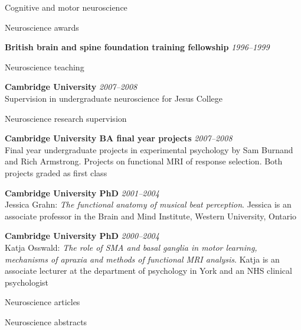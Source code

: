 \documentclass{cv}
\newcommand{\PlaceDateNote}[3]{{\bf #1} \hfill {\em #2} \\#3}
\begin{document}
\begin{cvSection}{Cognitive and motor neuroscience}

\begin{cvSubSection}{Neuroscience awards}

{\bf British brain and spine foundation training fellowship} \hfill {\em
1996--1999}

\end{cvSubSection}

\begin{cvSubSection}{Neuroscience teaching}

\PlaceDateNote{Cambridge University}{2007--2008}{
Supervision in undergraduate neuroscience for Jesus College}

\end{cvSubSection}

\begin{cvSubSection}{Neuroscience research supervision}

\PlaceDateNote{Cambridge University BA final year projects}{2007--2008}
{Final year undergraduate projects in experimental psychology by Sam Burnand
and Rich Armstrong.  Projects on functional MRI of response selection.  Both
projects graded as first class}

\PlaceDateNote{Cambridge University PhD}{2001--2004}
{Jessica Grahn: {\em The functional anatomy of musical beat perception}.
Jessica is an associate professor in the Brain and Mind Institute, Western
University, Ontario}

\PlaceDateNote{Cambridge University PhD}{2000--2004}
{Katja Osswald: {\em The role of SMA and basal ganglia in motor learning,
mechanisms of apraxia and methods of functional MRI analysis}. Katja is an
associate lecturer at the department of psychology in York and an NHS clinical
psychologist}

\end{cvSubSection}

\begin{cvSubSection}{Neuroscience articles}

\printbibliography[heading=none,
    keyword=movethink,
    keyword=article,
notkeyword=omit]

\end{cvSubSection}

\begin{cvSubSection}{Neuroscience abstracts}

\printbibliography[heading=none,
    keyword=movethink,
    keyword=abstract,
notkeyword=omit]

\end{cvSubSection}

\end{cvSection}
\end{document}
